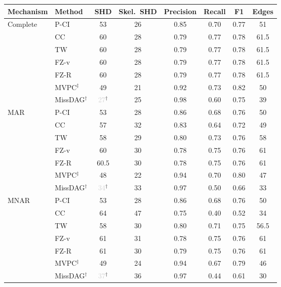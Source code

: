 \begin{tabular}{llcccccc}
    \toprule
    Mechanism & Method & SHD & Skel.\ SHD & Precision & Recall & F1 & Edges \\
    \midrule
    Complete  & P-CI               & 53 & 26 & 0.85 & 0.70 & 0.77 & 51 \\
              & CC                 & 60 & 28 & 0.79 & 0.77 & 0.78 & 61.5 \\
              & TW                 & 60 & 28 & 0.79 & 0.77 & 0.78 & 61.5 \\
              & FZ-v               & 60 & 28 & 0.79 & 0.77 & 0.78 & 61.5 \\
              & FZ-R               & 60 & 28 & 0.79 & 0.77 & 0.78 & 61.5 \\
              & MVPC$^\ddagger$    & 49 & 21 & 0.92 & 0.73 & 0.82 & 50 \\
              & MissDAG$^\dagger$  & \textcolor{lightgray}{27}$^\dagger$ & 25 & 0.98 & 0.60 & 0.75 & 39 \\
    \midrule
    MAR       & P-CI               & 53 & 28 & 0.86 & 0.68 & 0.76 & 50 \\
              & CC                 & 57 & 32 & 0.83 & 0.64 & 0.72 & 49 \\
              & TW                 & 58 & 29 & 0.80 & 0.73 & 0.76 & 58 \\
              & FZ-v               & 60 & 30 & 0.78 & 0.75 & 0.76 & 61 \\
              & FZ-R               & 60.5 & 30 & 0.78 & 0.75 & 0.76 & 61 \\
              & MVPC$^\ddagger$    & 48 & 22 & 0.94 & 0.70 & 0.80 & 47 \\
              & MissDAG$^\dagger$  & \textcolor{lightgray}{34}$^\dagger$ & 33 & 0.97 & 0.50 & 0.66 & 33 \\
    \midrule
    MNAR      & P-CI               & 53 & 28 & 0.86 & 0.68 & 0.76 & 50 \\
              & CC                 & 64 & 47 & 0.75 & 0.40 & 0.52 & 34 \\
              & TW                 & 58 & 30 & 0.80 & 0.71 & 0.75 & 56.5 \\
              & FZ-v               & 61 & 31 & 0.78 & 0.75 & 0.76 & 61 \\
              & FZ-R               & 61 & 30 & 0.79 & 0.75 & 0.76 & 61 \\
              & MVPC$^\ddagger$    & 49 & 24 & 0.94 & 0.67 & 0.79 & 46 \\
              & MissDAG$^\dagger$  & \textcolor{lightgray}{37}$^\dagger$ & 36 & 0.97 & 0.44 & 0.61 & 30 \\

\end{tabular}
